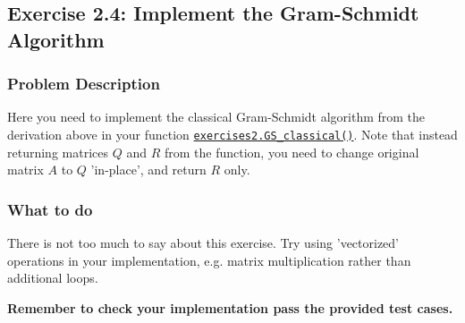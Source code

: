 \subsection*{Exercise 2.4: Implement the Gram-Schmidt Algorithm}
\subsubsection*{Problem Description}%
Here you need to implement the classical Gram-Schmidt algorithm from the derivation above in your function \href{https://comp-lin-alg.github.io/cla_utils.html#cla_utils.exercises2.GS_classical}{\texttt{exercises2.GS\_classical()}}. Note that instead returning matrices \(Q\) and \(R\) from the function, you need to change original matrix \(A\) to \(Q\) 'in-place', and return \(R\) only.
\subsubsection*{What to do}
There is not too much to say about this exercise. Try using 'vectorized' operations in your implementation, e.g. matrix multiplication rather than additional loops. \medskip

\noindent \textbf{Remember to check your implementation pass the provided test cases.}